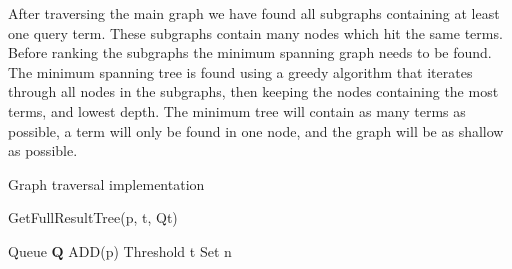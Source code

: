 After traversing the main graph we have found all subgraphs containing at least one query term. These subgraphs contain many nodes which hit the same terms. Before ranking the subgraphs the minimum spanning graph needs to be found. The minimum spanning tree is found using a greedy algorithm that iterates through all nodes in the subgraphs, then keeping the nodes containing the most terms, and lowest depth. The minimum tree will contain as many terms as possible, a term will only be found in one node, and the graph will be as shallow as possible.

Graph traversal implementation

\begin{algorithm}[H]
    \caption{GetFullResultTree(p, t, Qt)}
    \SetAlgoLined
    Queue $\mathbf{Q}$ ADD(p)\; Threshold t\; Set n \;
\end{algorithm}



